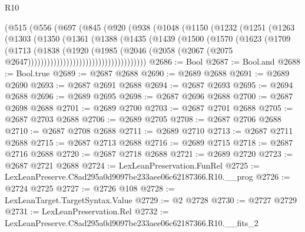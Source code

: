 \begin{lexlean}{R10}
\begin{coremodule}
                    (@515
                      (@556
                        (@697
                          (@845
                            (@920
                              (@938
                                (@1048
                                  (@1150
                                    (@1232
                                      (@1251
                                        (@1263
                                          (@1303
                                            (@1350
                                              (@1361
                                                (@1388
                                                  (@1435
                                                    (@1439
                                                      (@1500
                                                        (@1570
                                                          (@1623
                                                            (@1709
                                                              (@1713
                                                                (@1838
                                                                  (@1920
                                                                    (@1985
                                                                      (@2046
                                                                        (@2058
                                                                          (@2067
                                                                            (@2075
                                                                              @2647)))))))))))))))))))))))))))))))))))))
@2686 := Bool
@2687 := Bool.and
@2688 := Bool.true
@2689 := @2687 @2688
@2690 := @2689 @2688
@2691 := @2689 @2690
@2693 := @2687 @2691 @2688
@2694 := @2687 @2693
@2695 := @2694 @2688
@2696 := @2689 @2695
@2698 := @2687 @2696 @2688
@2700 := @2687 @2698 @2688
@2701 := @2689 @2700
@2703 := @2687 @2701 @2688
@2705 := @2687 @2703 @2688
@2706 := @2689 @2705
@2708 := @2687 @2706 @2688
@2710 := @2687 @2708 @2688
@2711 := @2689 @2710
@2713 := @2687 @2711 @2688
@2715 := @2687 @2713 @2688
@2716 := @2689 @2715
@2718 := @2687 @2716 @2688
@2720 := @2687 @2718 @2688
@2721 := @2689 @2720
@2723 := @2687 @2721 @2688
@2724 := LexLeanPreservation.FunRel
@2725 := LexLeanPreserve.C8ad295a0d9097be233aee06c62187366.R10.__prog
@2726 := @2724 @2725
@2727 := @2726 @108
@2728 := LexLeanTarget.TargetSyntax.Value
@2729 := @2 @2728
@2730 := @2727 @2729
@2731 := LexLeanPreservation.Rel
@2732 := LexLeanPreserve.C8ad295a0d9097be233aee06c62187366.R10.__fits_2

\end{coremodule}
\end{lexlean}
